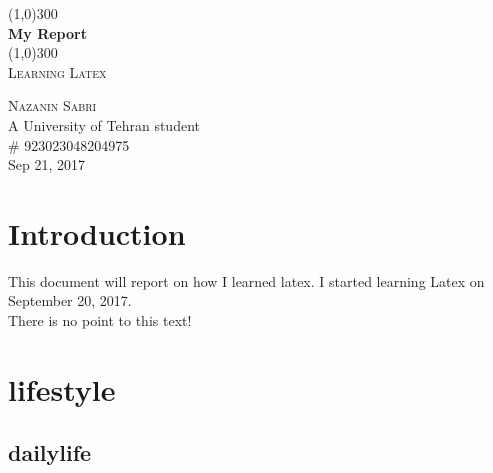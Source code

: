 \documentclass{article}
\begin{document}
\begin{titlepage}
	\begin{center}

	\line(1,0){300}\\
	[0.25in]
	\huge{\bfseries My Report}\\
	[2mm]
	\line(1,0){300}\\
	[0.75cm]
	\textsc{\large Learning Latex}\\
	[10cm]
	\end{center}

	\begin{flushright}
	\textsc{\large Nazanin Sabri\\}
	A University of Tehran student\\
	\# 923023048204975\\
	Sep 21, 2017
	\end{flushright}

\end{titlepage}

\section{Introduction}\label{sec:intro}
This document will report on how I learned latex. I started learning Latex on September 20, 2017.\\ There is no point to this text!\\
\lipsum[1]


\section{lifestyle}\label{sec:lifestyle}
\lipsum[2]
\subsection{dailylife}
\lipsum[1]
\end{document}
